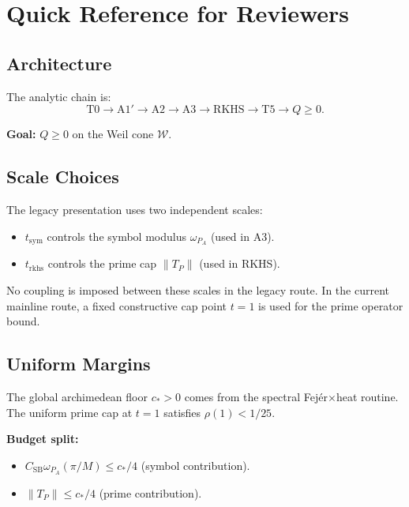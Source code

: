 \section{Quick Reference for Reviewers}\label{sec:quick-ref}

\subsection{Architecture}

The analytic chain is:
\begin{equation}
  \text{T0} \to \text{A1$'$} \to \text{A2} \to \text{A3} \to \text{RKHS} \to \text{T5} \to Q \geq 0.
\end{equation}

\textbf{Goal:} $Q \geq 0$ on the Weil cone $\mathcal{W}$.

\subsection{Scale Choices}

The legacy presentation uses two independent scales:

\begin{itemize}
  \item $t_{\mathrm{sym}}$ controls the symbol modulus $\omega_{P_A}$ (used in A3).
  \item $t_{\mathrm{rkhs}}$ controls the prime cap $\|T_P\|$ (used in RKHS).
\end{itemize}

No coupling is imposed between these scales in the legacy route. In the current mainline route, a fixed constructive cap point $t=1$ is used for the prime operator bound.

\subsection{Uniform Margins}

The global archimedean floor $c_* > 0$ comes from the spectral Fej\'er$\times$heat routine. The uniform prime cap at $t = 1$ satisfies $\rho(1) < 1/25$.

\textbf{Budget split:}
\begin{itemize}
  \item $C_{\mathrm{SB}} \omega_{P_A}(\pi/M) \leq c_*/4$ (symbol contribution).
  \item $\|T_P\| \leq c_*/4$ (prime contribution).
\end{itemize}

